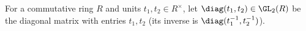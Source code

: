 For a commutative ring $R$ and units $t_1,t_2\in R^\times$, let $\diag(t_1,t_2)\in\GL_2(R)$ be the diagonal matrix with entries $t_1,t_2$ (its inverse is $\diag(t_1^{-1},t_2^{-1})$).
